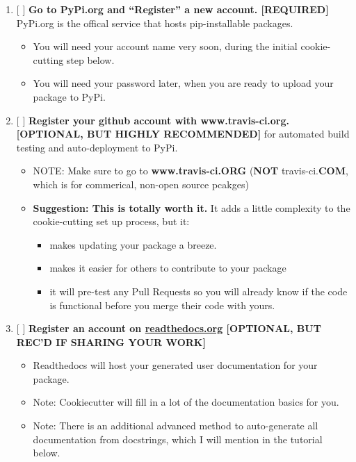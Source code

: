 \documentclass[11pt]{article}
\providecommand{\tightlist}{%
      \setlength{\itemsep}{0pt}\setlength{\parskip}{0pt}}
\begin{document}
\begin{enumerate}
\def\labelenumi{\arabic{enumi}.}
\tightlist
\item
  {[} {]} \textbf{Go to PyPi.org and ``Register'' a new account.
  {[}REQUIRED{]}} PyPi.org is the offical service that hosts
  pip-installable packages.

  \begin{itemize}
  \tightlist
  \item
    You will need your account name very soon, during the initial
    cookie-cutting step below.
  \item
    You will need your password later, when you are ready to upload your
    package to PyPi. 
  \end{itemize}
\item
  {[} {]} \textbf{Register your github account with www.travis-ci.org.
  {[}OPTIONAL, BUT HIGHLY RECOMMENDED{]}} for automated build testing
  and auto-deployment to PyPi.

  \begin{itemize}
  \tightlist
  \item
    NOTE: Make sure to go to \textbf{www.travis-ci.ORG} (\textbf{NOT}
    travis-ci.\textbf{COM}, which is for commerical, non-open source
    pcakges) 
  \item
    \textbf{Suggestion: This is totally worth it.} It adds a little
    complexity to the cookie-cutting set up process, but it:

    \begin{itemize}
    \tightlist
    \item
      makes updating your package a breeze.
    \item
      makes it easier for others to contribute to your package
    \item
      it will pre-test any Pull Requests so you will already know if the
      code is functional before you merge their code with yours.
    \end{itemize}
  \end{itemize}
\item
  {[} {]} \textbf{Register an account on
  \href{https://readthedocs.org/}{readthedocs.org} {[}OPTIONAL, BUT
  REC'D IF SHARING YOUR WORK{]}}

  \begin{itemize}
  \tightlist
  \item
    Readthedocs will host your generated user documentation for your
    package.
  \item
    Note: Cookiecutter will fill in a lot of the documentation basics
    for you.
  \item
    Note: There is an additional advanced method to auto-generate all
    documentation from docstrings, which I will mention in the tutorial
    below.
  \end{itemize}
\end{enumerate}
\end{document}

